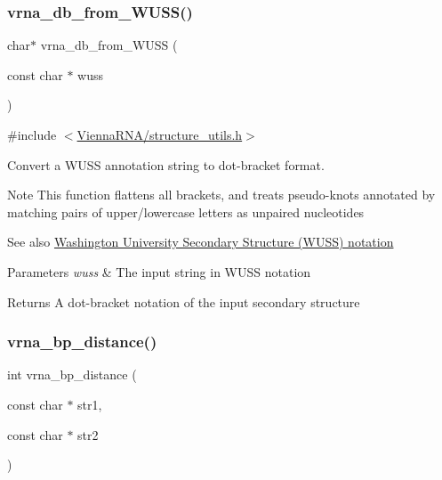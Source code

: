 \subsubsection{\texorpdfstring{vrna\+\_\+db\+\_\+from\+\_\+\+W\+U\+S\+S()}{vrna\_db\_from\_WUSS()}}
{\footnotesize\ttfamily char$\ast$ vrna\+\_\+db\+\_\+from\+\_\+\+W\+U\+SS (\begin{DoxyParamCaption}\item[{const char $\ast$}]{wuss }\end{DoxyParamCaption})}



{\ttfamily \#include $<$\hyperlink{structure__utils_8h}{Vienna\+R\+N\+A/structure\+\_\+utils.\+h}$>$}



Convert a W\+U\+SS annotation string to dot-\/bracket format. 

\begin{DoxyNote}{Note}
This function flattens all brackets, and treats pseudo-\/knots annotated by matching pairs of upper/lowercase letters as unpaired nucleotides
\end{DoxyNote}
\begin{DoxySeeAlso}{See also}
\hyperlink{rna_structure_notations_wuss-notation}{Washington University Secondary Structure (W\+U\+SS) notation}
\end{DoxySeeAlso}

\begin{DoxyParams}{Parameters}
{\em wuss} & The input string in W\+U\+SS notation \\
\hline
\end{DoxyParams}
\begin{DoxyReturn}{Returns}
A dot-\/bracket notation of the input secondary structure 
\end{DoxyReturn}
\mbox{\label{group__struct__utils_ga65bdfbac6a16bf30286e8a3f7d15f60a}} 
\subsubsection{\texorpdfstring{vrna\+\_\+bp\+\_\+distance()}{vrna\_bp\_distance()}}
{\footnotesize\ttfamily int vrna\+\_\+bp\+\_\+distance (\begin{DoxyParamCaption}\item[{const char $\ast$}]{str1,  }\item[{const char $\ast$}]{str2 }\end{DoxyParamCaption})}



